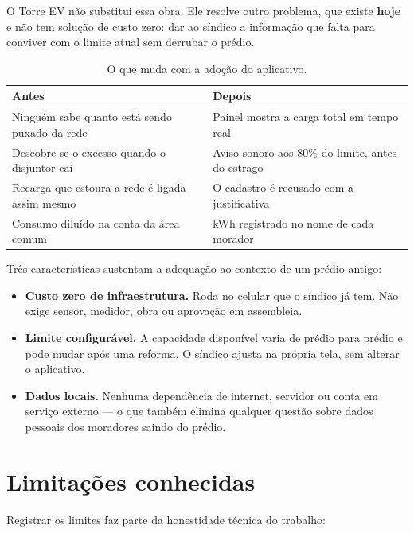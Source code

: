 \documentclass[12pt,a4paper]{article}
\begin{document}
O Torre EV não substitui essa obra. Ele resolve outro problema, que existe \textbf{hoje} e
não tem solução de custo zero: dar ao síndico a informação que falta para conviver com o
limite atual sem derrubar o prédio.

\begin{table}[H]
\centering
\small
\begin{tabular}{@{}p{6.4cm}p{6.4cm}@{}}
\toprule
\textbf{Antes} & \textbf{Depois} \\
\midrule
Ninguém sabe quanto está sendo puxado da rede &
Painel mostra a carga total em tempo real \\
\addlinespace
Descobre-se o excesso quando o disjuntor cai &
Aviso sonoro aos 80\% do limite, antes do estrago \\
\addlinespace
Recarga que estoura a rede é ligada assim mesmo &
O cadastro é recusado com a justificativa \\
\addlinespace
Consumo diluído na conta da área comum &
kWh registrado no nome de cada morador \\
\bottomrule
\end{tabular}
\caption{O que muda com a adoção do aplicativo.}
\end{table}

Três características sustentam a adequação ao contexto de um prédio antigo:

\begin{itemize}[itemsep=3pt]
\item \textbf{Custo zero de infraestrutura.} Roda no celular que o síndico já tem. Não
      exige sensor, medidor, obra ou aprovação em assembleia.
\item \textbf{Limite configurável.} A capacidade disponível varia de prédio para prédio e
      pode mudar após uma reforma. O síndico ajusta na própria tela, sem alterar o
      aplicativo.
\item \textbf{Dados locais.} Nenhuma dependência de internet, servidor ou conta em
      serviço externo --- o que também elimina qualquer questão sobre dados pessoais dos
      moradores saindo do prédio.
\end{itemize}

\section{Limitações conhecidas}

Registrar os limites faz parte da honestidade técnica do trabalho:
\end{document}
